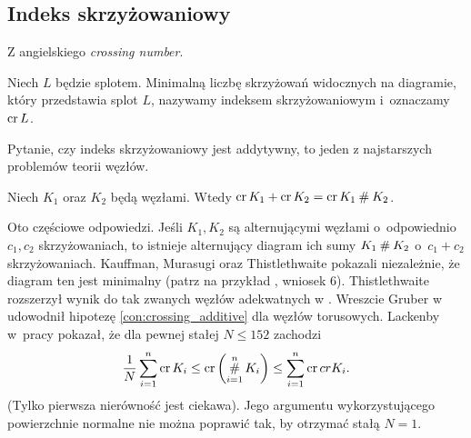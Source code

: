 \subsection{Indeks skrzyżowaniowy} %
\label{sub:crossing_number}
Z angielskiego \emph{crossing number}.

\begin{definition}
    Niech $L$ będzie splotem.
    Minimalną liczbę skrzyżowań widocznych na diagramie, który przedstawia splot $L$, nazywamy indeksem skrzyżowaniowym i~oznaczamy $\operatorname{cr} L$.
\end{definition}

Pytanie, czy indeks skrzyżowaniowy jest addytywny, to jeden z najstarszych problemów teorii węzłów.

\begin{conjecture}
    \label{con:crossing_additive}
    Niech $K_1$ oraz $K_2$ będą węzłami.
    Wtedy $\operatorname{cr} K_1 + \operatorname{cr} K_2 = \operatorname{cr} K_1 \mathbin{\#} K_2$.
\end{conjecture}

Oto częściowe odpowiedzi.
Jeśli $K_1, K_2$ są alternującymi węzłami o~odpowiednio $c_1, c_2$ skrzyżowaniach, to istnieje alternujący diagram ich sumy $K_1 \mathbin{\#} K_2$ o~$c_1 + c_2$ skrzyżowaniach.
Kauffman, Murasugi oraz Thistlethwaite pokazali niezależnie, że diagram ten jest minimalny (patrz na przykład \cite{murasugi87}, wniosek 6).
Thistlethwaite rozszerzył wynik do tak zwanych węzłów adekwatnych w \cite{thistlethwaite88}.
Wreszcie Gruber w \cite{gruber03} udowodnił hipotezę \ref{con:crossing_additive} dla węzłów torusowych.
Lackenby w~pracy \cite{lackenby09} pokazał, że dla pewnej stałej $N \le 152$ zachodzi
\begin{equation}
    \frac 1 N \sum_{i=1}^n \operatorname{cr} K_i \le \operatorname{cr} \left(\operatorname*{\#}_{i=1}^n K_i\right) \le \sum_{i=1}^n \operatorname{cr}{cr} K_i.
\end{equation}
(Tylko pierwsza nierówność jest ciekawa).
Jego argumentu wykorzystującego powierzchnie normalne nie można poprawić tak, by otrzymać stałą $N = 1$.

